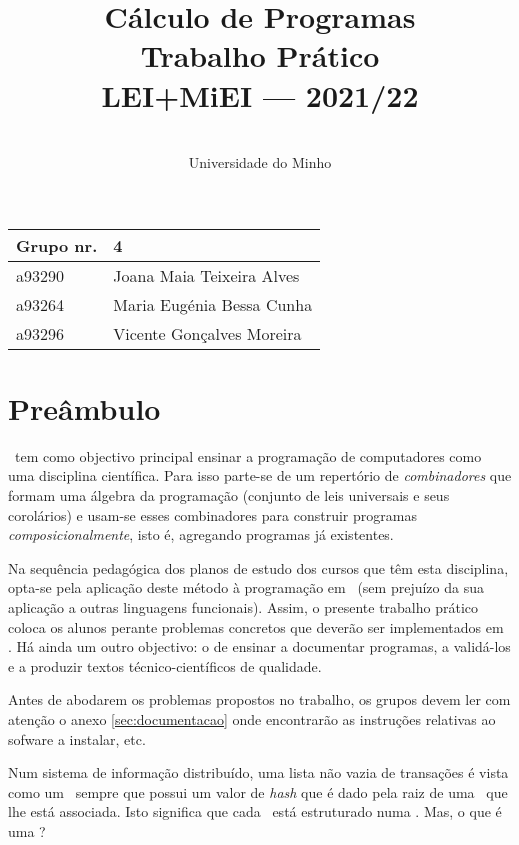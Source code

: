 \documentclass[a4paper]{article}
\title{
          Cálculo de Programas
\\
          Trabalho Prático
\\
          LEI+MiEI --- 2021/22
}
\author{
          \dium
\\
          Universidade do Minho
}
\date\mydate
\begin{document}
\maketitle

\begin{center}\large
\begin{tabular}{ll}
\textbf{Grupo} nr. & 4
\\\hline
a93290 & Joana Maia Teixeira Alves
\\
a93264 & Maria Eugénia Bessa Cunha
\\
a93296 & Vicente Gonçalves Moreira
\end{tabular}
\end{center}

\section{Preâmbulo}

\CP\ tem como objectivo principal ensinar
a progra\-mação de computadores como uma disciplina científica. Para isso
parte-se de um repertório de \emph{combinadores} que formam uma álgebra da
programação (conjunto de leis universais e seus corolários) e usam-se esses
combinadores para construir programas \emph{composicionalmente}, isto é,
agregando programas já existentes.

Na sequência pedagógica dos planos de estudo dos cursos que têm
esta disciplina, opta-se pela aplicação deste método à programação
em \Haskell\ (sem prejuízo da sua aplicação a outras linguagens
funcionais). Assim, o presente trabalho prático coloca os
alunos perante problemas concretos que deverão ser implementados em
\Haskell.  Há ainda um outro objectivo: o de ensinar a documentar
programas, a validá-los e a produzir textos técnico-científicos de
qualidade.

Antes de abodarem os problemas propostos no trabalho, os grupos devem ler
com atenção o anexo \ref{sec:documentacao} onde encontrarão as instruções
relativas ao sofware a instalar, etc.


\Problema

Num sistema de informação distribuído, uma lista não vazia de transações
é vista como um \textit\blockchain\ sempre que possui um valor de \textit{hash}
que é dado pela raiz de uma \MerkleTree\ que lhe está associada. Isto significa
que cada \textit\blockchain\ está estruturado numa \MerkleTree.
Mas, o que é uma \MerkleTree?
\end{document}
